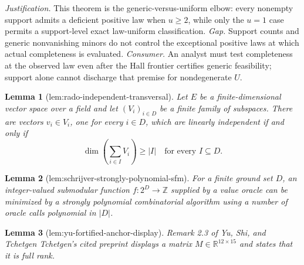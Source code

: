 \documentclass{article}
\newtheorem{lemma}{Lemma}
\begin{document}
\par\smallskip\noindent \textit{Justification.} This theorem is the generic-versus-uniform elbow: every nonempty support admits a deficient positive law when \(u\geq2\), while only the \(u=1\) case permits a support-level exact law-uniform classification. \textit{Gap.} Support counts and generic nonvanishing minors do not control the exceptional positive laws at which actual completeness is evaluated. \textit{Consumer.} An analyst must test completeness at the observed law even after the Hall frontier certifies generic feasibility; support alone cannot discharge that premise for nondegenerate \(U\).

\begin{lemma}[lem:rado-independent-transversal]\label{lem:rado-independent-transversal}
Let \(E\) be a finite-dimensional vector space over a field and let \((V_i)_{i\in D}\) be a finite family of subspaces.  There are vectors \(v_i\in V_i\), one for every \(i\in D\), which are linearly independent if and only if
\[
\dim\left(\sum_{i\in I}V_i\right)\ge |I|
\quad\text{for every }I\subseteq D.
\]
\end{lemma}

\begin{lemma}[lem:schrijver-strongly-polynomial-sfm]\label{lem:schrijver-strongly-polynomial-sfm}
For a finite ground set \(D\), an integer-valued submodular function \(f:2^D\to\mathbb Z\) supplied by a value oracle can be minimized by a strongly polynomial combinatorial algorithm using a number of oracle calls polynomial in \(|D|\).
\end{lemma}

\begin{lemma}[lem:yu-fortified-anchor-display]\label{lem:yu-fortified-anchor-display}
Remark 2.3 of Yu, Shi, and Tchetgen Tchetgen's cited preprint displays a matrix \(M\in\mathbb R^{12\times15}\) and states that it is full rank.
\end{lemma}
\end{document}
